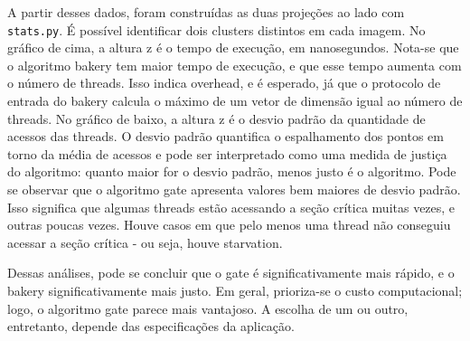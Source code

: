 \documentclass[10pt,twocolumn]{article}
\begin{document}
A partir desses dados, foram construídas as duas projeções ao lado com \texttt{stats.py}. É possível identificar dois clusters distintos em cada imagem. No gráfico de cima, a altura z é o tempo de execução, em nanosegundos. Nota-se que o algoritmo bakery tem maior tempo de execução, e que esse tempo aumenta com o número de threads. Isso indica overhead, e é esperado, já que o protocolo de entrada do bakery calcula o máximo de um vetor de dimensão igual ao número de threads. No gráfico de baixo, a altura z é o desvio padrão da quantidade de acessos das threads. O desvio padrão quantifica o espalhamento dos pontos em torno da média de acessos e pode ser interpretado como uma medida de justiça do algoritmo: quanto maior for o desvio padrão, menos justo é o algoritmo. Pode se observar que o algoritmo gate apresenta valores bem maiores de desvio padrão. Isso significa que algumas threads estão acessando a seção crítica muitas vezes, e outras poucas vezes. Houve casos em que pelo menos uma thread não conseguiu acessar a seção crítica - ou seja, houve starvation.

Dessas análises, pode se concluir que o gate é significativamente mais rápido, e o bakery significativamente mais justo. Em geral, prioriza-se o custo computacional; logo, o algoritmo gate parece mais vantajoso. A escolha de um ou outro, entretanto, depende das especificações da aplicação.
\end{document}

